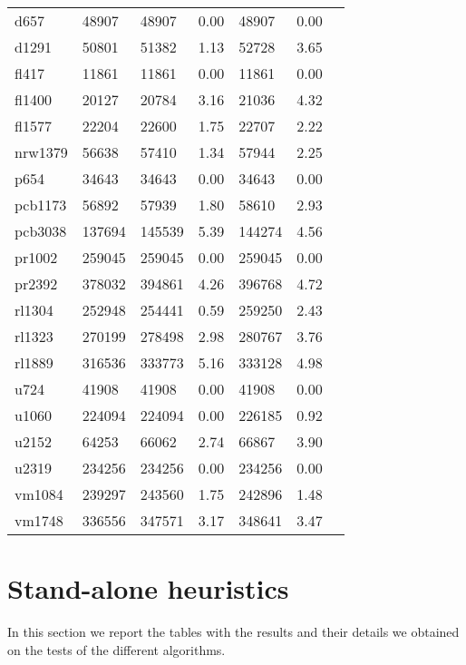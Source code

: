 \begin{center}
\begin{longtable}{lllllll}
			d657	 &	48907 & 48907    & 0.00	& 48907	& 0.00  \\
			d1291 &	50801 & 51382    & 1.13	& 52728	& 3.65  \\
			fl417 &	11861 & 11861    & 0.00	& 11861	& 0.00  \\
			fl1400 &	20127 & 20784   & 3.16	& 21036	& 4.32  \\
			fl1577 & 22204 & 22600   & 1.75	& 22707	& 2.22  \\
			nrw1379 & 56638 & 57410  & 1.34	& 57944	& 2.25  \\
			p654    & 34643 & 34643  & 0.00	& 34643	& 0.00  \\
			pcb1173 & 56892 & 57939  & 1.80	& 58610	& 2.93  \\
			pcb3038 & 137694 & 145539 & 5.39 & 144274 & 4.56  \\
			pr1002	& 259045 & 259045 & 0.00 & 259045 & 0.00  \\
			pr2392	& 378032 & 394861 & 4.26 & 396768 & 4.72  \\
			rl1304	& 252948 & 254441 & 0.59 & 259250 & 2.43  \\
			rl1323	& 270199 & 278498 & 2.98 & 280767 & 3.76  \\
			rl1889	& 316536 & 333773 & 5.16 & 333128 & 4.98  \\
			u724		& 41908 & 41908  & 0.00  & 41908 & 0.00  \\
			u1060	& 224094 & 224094 & 0.00 & 226185 & 0.92  \\
			u2152  	& 64253 & 66062	& 2.74	& 66867 & 3.90  \\
			u2319 	& 234256 & 234256	 & 0.00 & 234256 & 0.00  \\
			vm1084 	& 239297 & 243560	 & 1.75 & 242896 & 1.48  \\
			vm1748	& 336556 & 347571	 & 3.17 & 348641 & 3.47  \\

\end{longtable}
\end{center}


\newpage
\section{Stand-alone heuristics} 
In this section we report the tables with the results and their details we obtained on the tests of the different algorithms.\\

\setlength\LTleft{\fill}

